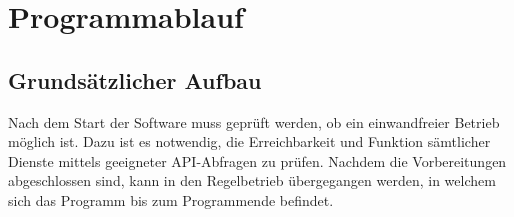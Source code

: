 \section{Programmablauf}

\subsection{Grundsätzlicher Aufbau}

Nach dem Start der Software muss geprüft werden, ob ein einwandfreier Betrieb möglich ist. Dazu ist es notwendig, die Erreichbarkeit und Funktion sämtlicher Dienste mittels geeigneter API-Abfragen zu prüfen. Nachdem die Vorbereitungen abgeschlossen sind, kann in den Regelbetrieb übergegangen werden, in welchem sich das Programm bis zum Programmende befindet. 

